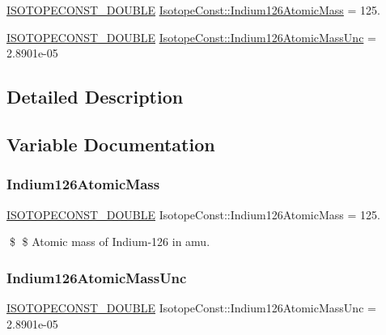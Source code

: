 \begin{DoxyCompactItemize}
\item 
\mbox{\hyperlink{group___isotope_const-_macros_ga8f45a7272ce02c0b4c65c44636ed719a}{I\+S\+O\+T\+O\+P\+E\+C\+O\+N\+S\+T\+\_\+\+D\+O\+U\+B\+LE}} \mbox{\hyperlink{group___isotope_const-_indium-_in126_ga5912772274e6f83daa6e9f329b97747b}{Isotope\+Const\+::\+Indium126\+Atomic\+Mass}} = 125.
\item 
\mbox{\hyperlink{group___isotope_const-_macros_ga8f45a7272ce02c0b4c65c44636ed719a}{I\+S\+O\+T\+O\+P\+E\+C\+O\+N\+S\+T\+\_\+\+D\+O\+U\+B\+LE}} \mbox{\hyperlink{group___isotope_const-_indium-_in126_gaa79920a378c9e3cbd753f8e252e647cc}{Isotope\+Const\+::\+Indium126\+Atomic\+Mass\+Unc}} = 2.\+8901e-\/05
\end{DoxyCompactItemize}


\subsection{Detailed Description}


\subsection{Variable Documentation}
\mbox{\label{group___isotope_const-_indium-_in126_ga5912772274e6f83daa6e9f329b97747b}} 
\subsubsection{\texorpdfstring{Indium126\+Atomic\+Mass}{Indium126AtomicMass}}
{\footnotesize\ttfamily \mbox{\hyperlink{group___isotope_const-_macros_ga8f45a7272ce02c0b4c65c44636ed719a}{I\+S\+O\+T\+O\+P\+E\+C\+O\+N\+S\+T\+\_\+\+D\+O\+U\+B\+LE}} Isotope\+Const\+::\+Indium126\+Atomic\+Mass = 125.}

\$ \$ Atomic mass of Indium-\/126 in amu. \mbox{\label{group___isotope_const-_indium-_in126_gaa79920a378c9e3cbd753f8e252e647cc}} 
\subsubsection{\texorpdfstring{Indium126\+Atomic\+Mass\+Unc}{Indium126AtomicMassUnc}}
{\footnotesize\ttfamily \mbox{\hyperlink{group___isotope_const-_macros_ga8f45a7272ce02c0b4c65c44636ed719a}{I\+S\+O\+T\+O\+P\+E\+C\+O\+N\+S\+T\+\_\+\+D\+O\+U\+B\+LE}} Isotope\+Const\+::\+Indium126\+Atomic\+Mass\+Unc = 2.\+8901e-\/05}

